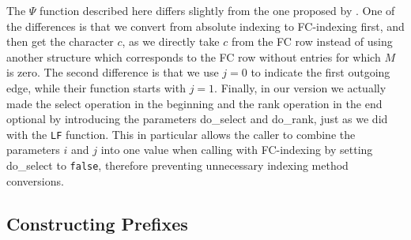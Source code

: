 \documentclass[a4paper,12pt,twoside,BCOR=10mm]{scrbook}
\begin{document}
The $ \Psi $ function described here differs slightly from the one proposed by \citet{Siren2014}.
One of the differences is that we convert from absolute indexing to FC-indexing first,
and then get the character $ c $, as we directly take $ c $ from the FC row instead
of using another structure which corresponds to the FC row without entries for which $ M $ is zero.
The second difference is that we use $ j \boldsymbol{=} 0 $ to indicate the first outgoing edge,
while their function starts with $ j \boldsymbol{=} 1 $.
Finally, in our version we actually made the select operation in the beginning and the rank operation in
the end optional by introducing the parameters do\_select and do\_rank,
just as we did with the \texttt{LF} function.
This in particular allows the caller to combine the parameters $ i $ and $ j $ into one value
when calling with FC-indexing by setting do\_select to \texttt{false},
therefore preventing unnecessary indexing method conversions.


\subsection{Constructing Prefixes}
\label{sec:gml_flat_construct_prefixes}
\end{document}
